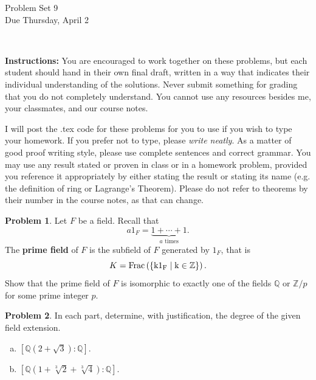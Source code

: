 \documentclass[11pt]{article}
\title{}
\date{\vspace{-0.5in}}
\newcommand{\Q}{\mathbb{Q}}
\newcommand{\Z}{\mathbb{Z}}
\theoremstyle{definition}
\newtheorem{problem}{Problem}
\begin{document}
\thispagestyle{fancy}
\pagestyle{fancy}

\vspace{3em}

\begin{center}
	{\LARGE Problem Set 9 \\}
	Due Thursday, April 2
\end{center}

\

\noindent
{\bf Instructions:}
You are encouraged to work together on these problems, but each student should hand in their own final draft, written in a way that indicates their individual understanding of the solutions. Never submit something for grading that you do not completely understand. You cannot use any resources besides me, your classmates, and our course notes.


I will post the .tex code for these problems for you to use if you wish to type your homework. If you prefer not to type, please  {\em write neatly}. As a matter of good proof writing style, please use complete sentences and correct grammar. You may use any result stated or proven in class or in a homework problem, provided you reference it appropriately by either stating the result or stating its name (e.g. the definition of ring or Lagrange's Theorem). Please do not refer to theorems by their number in the course notes, as that can change.


\begin{problem}
Let $F$ be a field. Recall that
$$a 1_F = \underset{a \textrm{ times}}{\underbrace{1 + \cdots + 1}}.$$ The {\bf prime field} of $F$ is the subfield of $F$ generated by $1_F$, that is
$$K=\rm{Frac}\left(\{k1_F \mid k\in \Z\}\right).$$ 
Show that the prime field of $F$ is isomorphic to exactly one of the fields $\Q$ or $\Z/p$ for some prime integer $p$.
\end{problem}

\begin{problem}
In each part, determine, with justification, the degree of the given field extension.
\begin{enumerate}[a)]
\item $[\Q(2 + \sqrt{3}) : \Q]$.
\item $[\Q(1 + \sqrt[3]{2}+\sqrt[3]{4}) : \Q]$.
\end{enumerate}
\end{problem}
\end{document}
